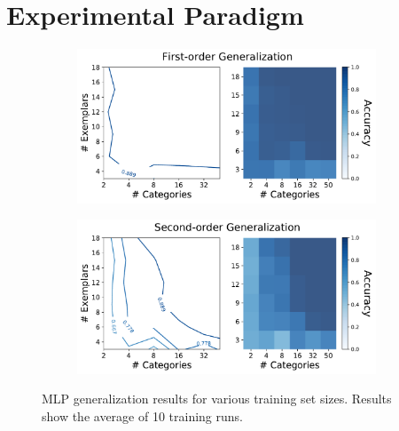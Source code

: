 \section{Experimental Paradigm}
\label{sec:experimental_paradigm}

\begin{figure}[h!]
    \begin{center}
        \begin{subfigure}[b]{0.48\textwidth}
            \begin{center}
                \includegraphics[width=0.98\textwidth]
                {figures/mlp_o1_acc.pdf}
            \end{center}
        \end{subfigure}
        \begin{subfigure}[b]{0.48\textwidth}
            \begin{center}
                \includegraphics[width=0.98\textwidth]
                {figures/mlp_o2_acc.pdf}
            \end{center}
        \end{subfigure}
    \end{center}
    \caption{MLP generalization results for various training set sizes. Results
    show the average of 10 training runs.}
    \label{fig:mlp_gen_results}
\end{figure}

